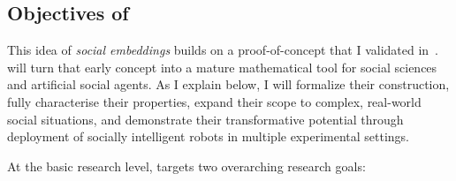 \subsection{Objectives of \project}
\label{sec:objectives}


This idea of \emph{social embeddings} builds on a proof-of-concept that I
validated in~\cite{lemaignan2024social}. \project will turn that early concept
into a mature mathematical tool for social sciences and artificial social
agents. As I explain below, I will formalize their construction,  fully
characterise their properties, expand their scope to complex, real-world social
situations, and demonstrate their transformative potential through deployment of
socially intelligent robots in multiple experimental settings.

\vspace{1em}

\noindent At the basic research level, \project targets two overarching research goals:

